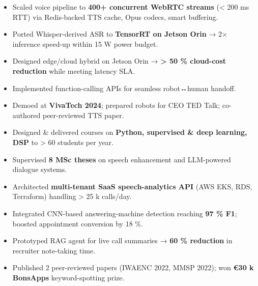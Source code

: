\documentclass[9pt,a4paper,ragged2e]{altacv}
\begin{document}
\begin{paracol}{2}
\begin{itemize}
  \item Scaled voice pipeline to \textbf{400+ concurrent WebRTC streams} (< 200 ms RTT) via Redis-backed TTS cache, Opus codecs, smart buffering.
  \item Ported Whisper-derived ASR to \textbf{TensorRT on Jetson Orin} → 2× inference speed-up within 15 W power budget.
  \item Designed edge/cloud hybrid on Jetson Orin → \textbf{> 50 \% cloud-cost reduction} while meeting latency SLA.
  \item Implemented function-calling APIs for seamless robot↔human handoff.
  \item Demoed at \textbf{VivaTech 2024}; prepared robots for CEO TED Talk; co-authored peer-reviewed TTS paper.
\end{itemize}

\vspace{4pt}
\begin{itemize}
  \item Designed \& delivered courses on \textbf{Python, supervised \& deep learning, DSP} to > 60 students per year.
  \item Supervised \textbf{8 MSc theses} on speech enhancement and LLM-powered dialogue systems.
\end{itemize}

\vspace{2pt}
\begin{itemize}
  \item Architected \textbf{multi-tenant SaaS speech-analytics API} (AWS EKS, RDS, Terraform) handling > 25 k calls/day.
  \item Integrated CNN-based answering-machine detection reaching \textbf{97 \% F1}; boosted appointment conversion by 18 \%.
  \item Prototyped RAG agent for live call summaries → \textbf{60 \% reduction} in recruiter note-taking time.
  \item Published 2 peer-reviewed papers (IWAENC 2022, MMSP 2022); won \textbf{€30 k BonsApps} keyword-spotting prize.
\end{itemize}


\end{paracol}
\end{document}
